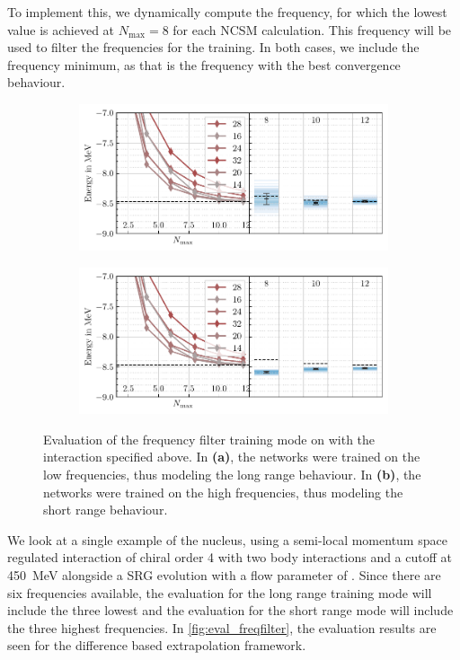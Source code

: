 To implement this, we dynamically compute the frequency, for which the lowest value is achieved at $N_\mathrm{max} = 8$ for each NCSM calculation. This frequency will be used to filter the frequencies for the training. In both cases, we include the frequency minimum, as that is the frequency with the best convergence behaviour.



\begin{figure}[H]
  \begin{subfigure}{\textwidth}
    \centering
    \includegraphics{media/outlook_frequency_lower.pdf}
    \caption{}
  \end{subfigure}
  \begin{subfigure}{\textwidth}
    \centering
    \includegraphics{media/outlook_frequency_higher.pdf}
    \caption{}
  \end{subfigure}
  \caption{Evaluation of the frequency filter training mode on  with the interaction specified above. In \textbf{(a)}, the networks were trained on the low frequencies, thus modeling the long range behaviour. In \textbf{(b)}, the networks were trained on the high frequencies, thus modeling the short range behaviour.}
  \label{fig:eval_freqfilter}
\end{figure}

We look at a single example of the  nucleus, using a semi-local momentum space regulated interaction of chiral order 4 with two body interactions and a cutoff at \SI{450}{\mega\electronvolt} alongside a SRG evolution with a flow parameter of . Since there are six frequencies available, the evaluation for the long range training mode will include the three lowest and the evaluation for the short range mode will include the three highest frequencies. In \autoref{fig:eval_freqfilter}, the evaluation results are seen for the difference based extrapolation framework.

